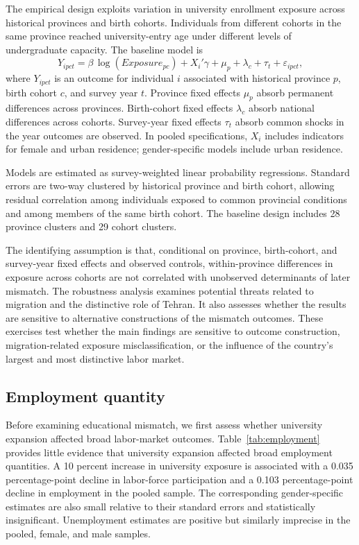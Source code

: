 The empirical design exploits variation in university enrollment exposure across historical provinces and birth cohorts. Individuals from different cohorts in the same province reached university-entry age under different levels of undergraduate capacity. The baseline model is
\begin{equation}
Y_{ipct} = \beta \, \log(Exposure_{pc}) + X_{i}'\gamma + \mu_{p} + \lambda_{c} + \tau_{t} + \varepsilon_{ipct},
\end{equation}
where $Y_{ipct}$ is an outcome for individual $i$ associated with historical province $p$, birth cohort $c$, and survey year $t$. Province fixed effects $\mu_{p}$ absorb permanent differences across provinces. Birth-cohort fixed effects $\lambda_{c}$ absorb national differences across cohorts. Survey-year fixed effects $\tau_{t}$ absorb common shocks in the year outcomes are observed. In pooled specifications, $X_{i}$ includes indicators for female and urban residence; gender-specific models include urban residence.

Models are estimated as survey-weighted linear probability regressions. Standard errors are two-way clustered by historical province and birth cohort, allowing residual correlation among individuals exposed to common provincial conditions and among members of the same birth cohort. The baseline design includes 28 province clusters and 29 cohort clusters.

The identifying assumption is that, conditional on province, birth-cohort, and survey-year fixed effects and observed controls, within-province differences in exposure across cohorts are not correlated with unobserved determinants of later mismatch. The robustness analysis examines potential threats related to migration and the distinctive role of Tehran. It also assesses whether the results are sensitive to alternative constructions of the mismatch outcomes. These exercises test whether the main findings are sensitive to outcome construction, migration-related exposure misclassification, or the influence of the country's largest and most distinctive labor market.

\subsection{Employment quantity}

Before examining educational mismatch, we first assess whether university expansion affected broad labor-market outcomes. Table~\ref{tab:employment} provides little evidence that university expansion affected broad employment quantities. A 10 percent increase in university exposure is associated with a 0.035 percentage-point decline in labor-force participation and a 0.103 percentage-point decline in employment in the pooled sample. The corresponding gender-specific estimates are also small relative to their standard errors and statistically insignificant. Unemployment estimates are positive but similarly imprecise in the pooled, female, and male samples.

